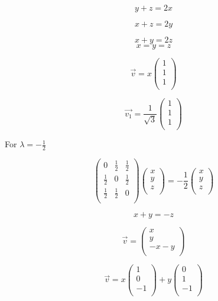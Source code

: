 \documentclass[12pt]{article}
\begin{document}
\[
    y + z = 2x
\]

\[
    x + z = 2y
\]

\[
    x + y = 2z
\]
\[
    x = y = z
\]

\[
    \vec{v} = x \begin{pmatrix}
        1 \\
        1 \\
        1 \\
    \end{pmatrix}
\]

\[
    \vec{v_1} = \frac{1}{\sqrt{3}} \begin{pmatrix}
        1 \\
        1 \\
        1 \\
    \end{pmatrix}
\]

For \(\lambda = -\frac{1}{2}\)

\[
    \begin{pmatrix}
        0           & \frac{1}{2} & \frac{1}{2} \\
        \frac{1}{2} & 0           & \frac{1}{2} \\
        \frac{1}{2} & \frac{1}{2} & 0           \\
    \end{pmatrix} \begin{pmatrix}
        x \\
        y \\
        z \\
    \end{pmatrix} = -\frac{1}{2} \begin{pmatrix}
        x \\
        y \\
        z \\
    \end{pmatrix}
\]

\[
    x + y = - z
\]

\[
    \vec{v} = \begin{pmatrix}
        x      \\
        y      \\
        -x - y \\
    \end{pmatrix}
\]

\[
    \vec{v} = x \begin{pmatrix}
        1 \\
        0 \\
        -1 \\
    \end{pmatrix} +
    y \begin{pmatrix}
        0 \\
        1 \\
        -1 \\
    \end{pmatrix}
\]
\end{document}
